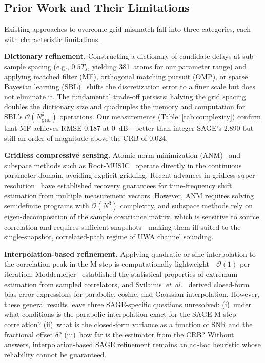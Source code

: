 \documentclass[a4paper,fleqn]{cas-dc}
\newcommand{\bigO}{\mathcal{O}}
\begin{document}
\subsection{Prior Work and Their Limitations}

Existing approaches to overcome grid mismatch fall into three categories, each with characteristic limitations.

\textbf{Dictionary refinement.} Constructing a dictionary of candidate delays at sub-sample spacing (e.g., $0.5T_s$, yielding 381~atoms for our parameter range) and applying matched filter (MF), orthogonal matching pursuit (OMP), or sparse Bayesian learning (SBL)~\cite{wipf2004} shifts the discretization error to a finer scale but does not eliminate it. The fundamental trade-off persists: halving the grid spacing doubles the dictionary size and quadruples the memory and computation for SBL's $\bigO(N_{\text{grid}}^2)$ operations. Our measurements (Table~\ref{tab:complexity}) confirm that MF achieves RMSE 0.187 at 0~dB---better than integer SAGE's 2.890 but still an order of magnitude above the CRB of 0.024.

\textbf{Gridless compressive sensing.} Atomic norm minimization (ANM)~\cite{tang2013,chi2020} and subspace methods such as Root-MUSIC~\cite{schmidt1986} operate directly in the continuous parameter domain, avoiding explicit gridding. Recent advances in gridless super-resolution~\cite{chi2020,safari2021} have established recovery guarantees for time-frequency shift estimation from multiple measurement vectors. However, ANM requires solving semidefinite programs with $\bigO(N^3)$ complexity, and subspace methods rely on eigen-decomposition of the sample covariance matrix, which is sensitive to source correlation and requires sufficient snapshots---making them ill-suited to the single-snapshot, correlated-path regime of UWA channel sounding.

\textbf{Interpolation-based refinement.} Applying quadratic or sinc interpolation to the correlation peak in the M-step is computationally lightweight---$\bigO(1)$ per iteration. Moddemeijer~\cite{moddemeijer1991} established the statistical properties of extremum estimation from sampled correlators, and Svilainis~\textit{et~al.}~\cite{svilainis2013} derived closed-form bias error expressions for parabolic, cosine, and Gaussian interpolation. However, these general results leave three SAGE-specific questions unresolved: (i)~under what conditions is the parabolic interpolation exact for the SAGE M-step correlation? (ii)~what is the closed-form variance as a function of SNR and the fractional offset $\delta$? (iii)~how far is the estimator from the CRB? Without answers, interpolation-based SAGE refinement remains an ad-hoc heuristic whose reliability cannot be guaranteed.
\end{document}
